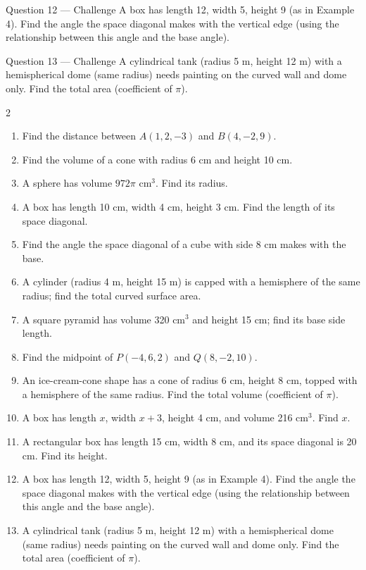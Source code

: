 \documentclass[11pt]{article}
\begin{document}
\begin{qbox}{Question 12 --- Challenge}
A box has length 12, width 5, height 9 (as in Example 4). Find the angle the space diagonal makes with the vertical edge (using the relationship between this angle and the base angle).\workspace{3.2cm}
\end{qbox}

\begin{qbox}{Question 13 --- Challenge}
A cylindrical tank (radius 5 m, height 12 m) with a hemispherical dome (same radius) needs painting on the curved wall and dome only. Find the total area (coefficient of $\pi$).\workspace{3cm}
\end{qbox}

\clearpage
{}

\begin{recapbox}
\begin{multicols}{2}
\small
\begin{enumerate}[leftmargin=*,itemsep=3pt]
  \item Find the distance between $A(1,2,-3)$ and $B(4,-2,9)$.
  \item Find the volume of a cone with radius 6 cm and height 10 cm.
  \item A sphere has volume $972\pi$ cm$^3$. Find its radius.
  \item A box has length 10 cm, width 4 cm, height 3 cm. Find the length of its space diagonal.
  \item Find the angle the space diagonal of a cube with side 8 cm makes with the base.
  \item A cylinder (radius 4 m, height 15 m) is capped with a hemisphere of the same radius; find the total curved surface area.
  \item A square pyramid has volume 320 cm$^3$ and height 15 cm; find its base side length.
  \item Find the midpoint of $P(-4,6,2)$ and $Q(8,-2,10)$.
  \item An ice-cream-cone shape has a cone of radius 6 cm, height 8 cm, topped with a hemisphere of the same radius. Find the total volume (coefficient of $\pi$).
  \item A box has length $x$, width $x+3$, height 4 cm, and volume 216 cm$^3$. Find $x$.
  \item A rectangular box has length 15 cm, width 8 cm, and its space diagonal is 20 cm. Find its height.
  \item A box has length 12, width 5, height 9 (as in Example 4). Find the angle the space diagonal makes with the vertical edge (using the relationship between this angle and the base angle).
  \item A cylindrical tank (radius 5 m, height 12 m) with a hemispherical dome (same radius) needs painting on the curved wall and dome only. Find the total area (coefficient of $\pi$).
\end{enumerate}
\end{multicols}
\end{recapbox}
\end{document}
